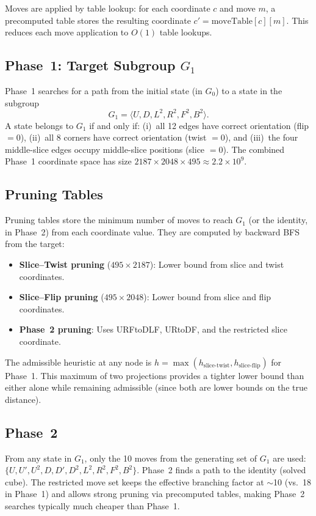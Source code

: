 \documentclass[10pt,twocolumn,a4paper]{article}
\begin{document}
Moves are applied by table lookup: for each coordinate $c$ and move $m$, a precomputed table stores the resulting coordinate $c' = \text{moveTable}[c][m]$. This reduces each move application to $O(1)$ table lookups.

\subsection{Phase~1: Target Subgroup $G_1$}
Phase~1 searches for a path from the initial state (in $G_0$) to a state in the subgroup
\begin{equation}
G_1 = \langle U, D, L^2, R^2, F^2, B^2 \rangle.
\end{equation}
A state belongs to $G_1$ if and only if: (i)~all 12 edges have correct orientation (flip $= 0$), (ii)~all 8 corners have correct orientation (twist $= 0$), and (iii)~the four middle-slice edges occupy middle-slice positions (slice $= 0$). The combined Phase~1 coordinate space has size $2187 \times 2048 \times 495 \approx 2.2 \times 10^9$.

\subsection{Pruning Tables}
\label{sec:pruning}
Pruning tables store the minimum number of moves to reach $G_1$ (or the identity, in Phase~2) from each coordinate value. They are computed by backward BFS from the target:

\begin{itemize}[leftmargin=*]
  \item \textbf{Slice--Twist pruning} ($495 \times 2187$): Lower bound from slice and twist coordinates.
  \item \textbf{Slice--Flip pruning} ($495 \times 2048$): Lower bound from slice and flip coordinates.
  \item \textbf{Phase~2 pruning}: Uses URFtoDLF, URtoDF, and the restricted slice coordinate.
\end{itemize}

The admissible heuristic at any node is $h = \max(h_{\text{slice-twist}}, h_{\text{slice-flip}})$ for Phase~1. This maximum of two projections provides a tighter lower bound than either alone while remaining admissible (since both are lower bounds on the true distance).

\subsection{Phase~2}
From any state in $G_1$, only the 10 moves from the generating set of $G_1$ are used: $\{U, U', U^2, D, D', D^2, L^2, R^2, F^2, B^2\}$. Phase~2 finds a path to the identity (solved cube). The restricted move set keeps the effective branching factor at $\sim$10 (vs.\ 18 in Phase~1) and allows strong pruning via precomputed tables, making Phase~2 searches typically much cheaper than Phase~1.
\end{document}
